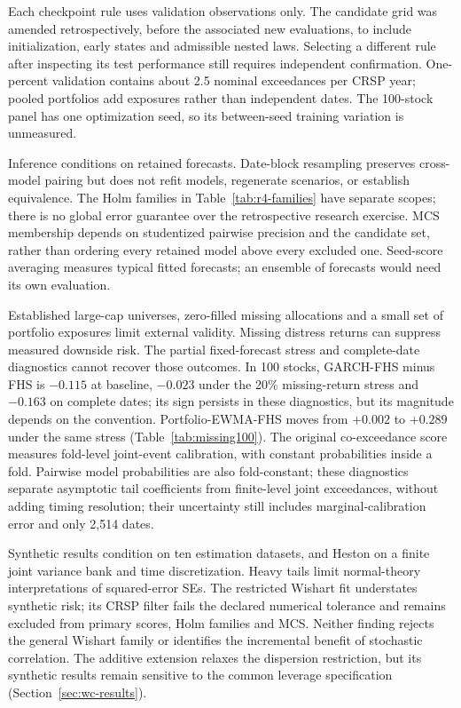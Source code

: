\documentclass[11pt]{article}
\theoremstyle{definition}\newtheorem{definition}[theorem]{Definition}
\theoremstyle{remark}\newtheorem{remark}[theorem]{Remark}
\begin{document}
Each checkpoint rule uses validation observations only. The candidate grid was amended retrospectively, before the associated new evaluations, to include initialization, early states and admissible nested laws. Selecting a different rule after inspecting its test performance still requires independent confirmation. One-percent validation contains about 2.5 nominal exceedances per CRSP year; pooled portfolios add exposures rather than independent dates. The 100-stock panel has one optimization seed, so its between-seed training variation is unmeasured.

Inference conditions on retained forecasts. Date-block resampling preserves cross-model pairing but does not refit models, regenerate scenarios, or establish equivalence. The Holm families in Table~\ref{tab:r4-families} have separate scopes; there is no global error guarantee over the retrospective research exercise. MCS membership depends on studentized pairwise precision and the candidate set, rather than ordering every retained model above every excluded one. Seed-score averaging measures typical fitted forecasts; an ensemble of forecasts would need its own evaluation.

Established large-cap universes, zero-filled missing allocations and a small set of portfolio exposures limit external validity. Missing distress returns can suppress measured downside risk. The partial fixed-forecast stress and complete-date diagnostics cannot recover those outcomes. In 100 stocks, GARCH-FHS minus FHS is $-0.115$ at baseline, $-0.023$ under the 20\% missing-return stress and $-0.163$ on complete dates; its sign persists in these diagnostics, but its magnitude depends on the convention. Portfolio-EWMA-FHS moves from $+0.002$ to $+0.289$ under the same stress (Table~\ref{tab:missing100}). The original co-exceedance score measures fold-level joint-event calibration, with constant probabilities inside a fold. Pairwise model probabilities are also fold-constant; these diagnostics separate asymptotic tail coefficients from finite-level joint exceedances, without adding timing resolution; their uncertainty still includes marginal-calibration error and only 2,514 dates.

Synthetic results condition on ten estimation datasets, and Heston on a finite joint variance bank and time discretization. Heavy tails limit normal-theory interpretations of squared-error SEs. The restricted Wishart fit understates synthetic risk; its CRSP filter fails the declared numerical tolerance and remains excluded from primary scores, Holm families and MCS. Neither finding rejects the general Wishart family or identifies the incremental benefit of stochastic correlation. The additive extension relaxes the dispersion restriction, but its synthetic results remain sensitive to the common leverage specification (Section~\ref{sec:wc-results}).
\end{document}
